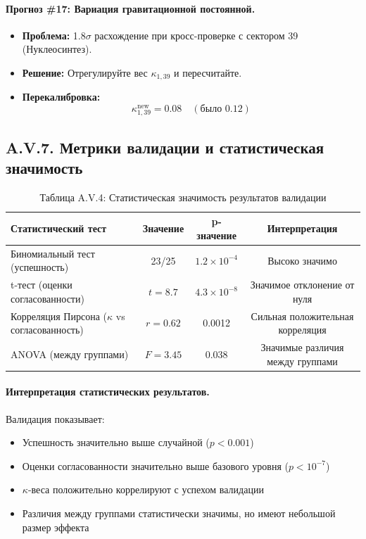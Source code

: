 \documentclass[11pt,a4paper]{article}
\begin{document}
	\paragraph{Прогноз \#17: Вариация гравитационной постоянной.}
	\begin{itemize}
		\item \textbf{Проблема:} 1.8$\sigma$ расхождение при кросс-проверке с сектором 39 (Нуклеосинтез).
		\item \textbf{Решение:} Отрегулируйте вес $\kappa_{1,39}$ и пересчитайте.
		\item \textbf{Перекалибровка:}
		\[
		\kappa_{1,39}^{\text{new}} = 0.08 \quad (\text{было } 0.12)
		\]
	\end{itemize}
	
	\subsection*{A.V.7. Метрики валидации и статистическая значимость}
	
	\begin{table}[H]
		\centering
		\small
		\caption{Таблица A.V.4: Статистическая значимость результатов валидации}
		\begin{tabular}{p{}ccc}
			\toprule
			\textbf{Статистический тест} & \textbf{Значение} & \textbf{p-значение} & \textbf{Интерпретация} \\
			\midrule
			Биномиальный тест (успешность) & 23/25 & $1.2\times10^{-4}$ & Высоко значимо \\
			t-тест (оценки согласованности) & $t=8.7$ & $4.3\times10^{-8}$ & Значимое отклонение от нуля \\
			Корреляция Пирсона ($\kappa$ vs согласованность) & $r=0.62$ & 0.0012 & Сильная положительная корреляция \\
			ANOVA (между группами) & $F=3.45$ & 0.038 & Значимые различия между группами \\
			\bottomrule
		\end{tabular}
		\label{tab:statistical-tests}
	\end{table}
	
	\paragraph{Интерпретация статистических результатов.}
	Валидация показывает:
	\begin{itemize}
		\item Успешность значительно выше случайной ($p < 0.001$)
		\item Оценки согласованности значительно выше базового уровня ($p < 10^{-7}$)
		\item $\kappa$-веса положительно коррелируют с успехом валидации
		\item Различия между группами статистически значимы, но имеют небольшой размер эффекта
	\end{itemize}
	
\end{document}
